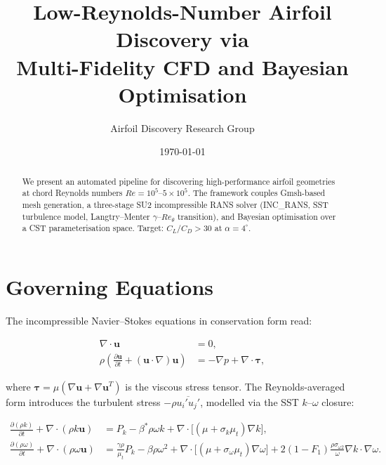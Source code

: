 \documentclass{article}
\title{Low-Reynolds-Number Airfoil Discovery via\\
       Multi-Fidelity CFD and Bayesian Optimisation}
\author{Airfoil Discovery Research Group}
\date{\today}
\begin{document}
\maketitle

\begin{abstract}
We present an automated pipeline for discovering high-performance airfoil
geometries at chord Reynolds numbers $Re = 10^5$--$5 \times 10^5$.
The framework couples Gmsh-based mesh generation, a three-stage SU2
incompressible RANS solver (INC\_RANS, SST turbulence model, Langtry--Menter
$\gamma$--$Re_\theta$ transition), and Bayesian optimisation over a
CST parameterisation space.  Target: $C_L/C_D > 30$ at $\alpha = 4^\circ$.
\end{abstract}

\tableofcontents
\newpage

\section{Governing Equations}

The incompressible Navier--Stokes equations in conservation form read:

\begin{align}
  \nabla \cdot \mathbf{u} &= 0, \label{eq:continuity} \\
  \rho \left( \frac{\partial \mathbf{u}}{\partial t}
    + (\mathbf{u} \cdot \nabla)\mathbf{u} \right)
    &= -\nabla p + \nabla \cdot \boldsymbol{\tau}, \label{eq:momentum}
\end{align}

where $\boldsymbol{\tau} = \mu(\nabla\mathbf{u} + \nabla\mathbf{u}^T)$ is
the viscous stress tensor.  The Reynolds-averaged form introduces the
turbulent stress $-\rho\overline{u_i' u_j'}$, modelled via the SST
$k$--$\omega$ closure:

\begin{align}
  \frac{\partial(\rho k)}{\partial t} + \nabla \cdot (\rho k \mathbf{u})
    &= P_k - \beta^* \rho \omega k
       + \nabla \cdot \bigl[(\mu + \sigma_k \mu_t)\nabla k\bigr], \\
  \frac{\partial(\rho \omega)}{\partial t}
    + \nabla \cdot (\rho \omega \mathbf{u})
    &= \frac{\gamma \rho}{\mu_t} P_k - \beta \rho \omega^2
       + \nabla \cdot \bigl[(\mu + \sigma_\omega \mu_t)\nabla \omega\bigr]
       + 2(1-F_1)\frac{\rho \sigma_{\omega 2}}{\omega}
         \nabla k \cdot \nabla \omega.
\end{align}
\end{document}
